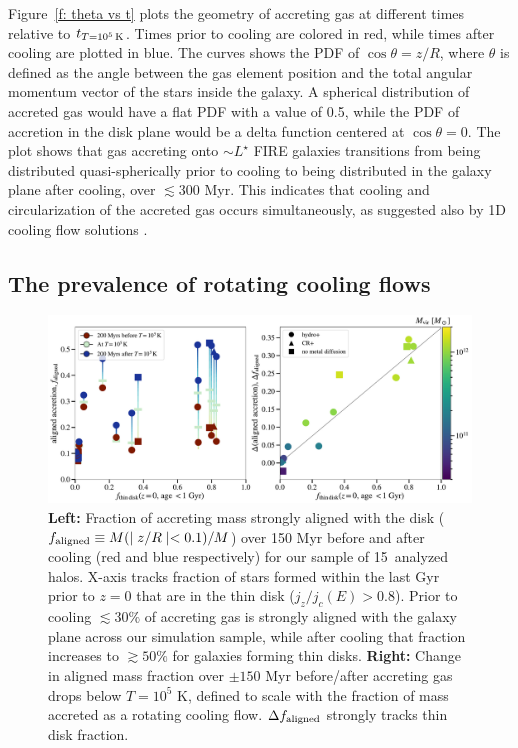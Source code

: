 \documentclass[fleqn,usenatbib]{mnras}
\newcommand{\tcon}{t_{T=10^5\,{\rm K}}}
\newcommand{\Nsample}{15}
\begin{document}
Figure~\ref{f: theta vs t} plots the geometry of accreting gas at different times relative to $\tcon$.
Times prior to cooling are colored in red, while times after cooling are plotted in blue.
The curves shows the PDF of $\cos \theta = z/R$, where $\theta$ is defined as the angle between the gas element position and the total angular momentum vector of the stars inside the galaxy.
A spherical distribution of accreted gas would have a flat PDF with a value of 0.5, while 
the PDF of accretion in the disk plane would be a delta function centered at $\cos\theta = 0$.
The plot shows that gas accreting onto $\sim L^\star$ FIRE galaxies transitions from being distributed quasi-spherically prior to cooling to being distributed in the galaxy plane after cooling, over $\lesssim 300$ Myr.
This indicates that cooling and circularization of the accreted gas occurs simultaneously, as suggested also by 1D cooling flow solutions \citep{Stern2020}.

\subsection{The prevalence of rotating cooling flows}
\label{s: prevalence}

\begin{figure}
    \centering
    \includegraphics[width=\textwidth]{figures/prevalence/aligned_fraction.pdf}
    \caption{
    \textbf{Left:}
    Fraction of accreting mass strongly aligned with the disk ($f_{\rm aligned} \equiv M(\mid z/R \mid < 0.1)/M$) over 150 Myr before and after cooling (red and blue respectively) for our sample of \Nsample~analyzed halos.
    X-axis tracks fraction of stars formed within the last Gyr prior to $z=0$ that are in the thin disk ($j_z/j_c(E)>0.8$).
    Prior to cooling $\lesssim 30\%$ of accreting gas is strongly aligned with the galaxy plane across our simulation sample,
    while after cooling that fraction increases to $\gtrsim 50\%$ for galaxies forming thin disks.
    \textbf{Right:}
    Change in aligned mass fraction over $\pm 150$ Myr before/after accreting gas drops below $T = 10^5$ K, defined to scale with the fraction of mass accreted as a rotating cooling flow.
    $\Delta f_{\rm aligned}$ strongly tracks thin disk fraction.
    }
    \label{f: prevalence}
\end{figure}
\end{document}
